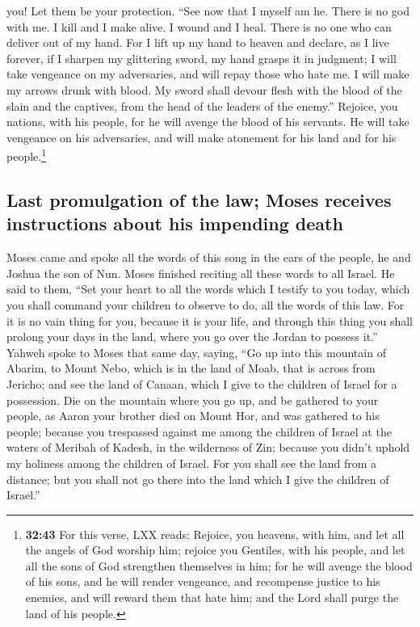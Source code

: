 you! Let them be your protection.  ``See now that I
myself am he. There is no god with me. I kill and I make alive. I wound
and I heal. There is no one who can deliver out of my hand.
 For I lift up my hand to heaven and declare, as I live
forever,  if I sharpen my glittering sword, my hand
grasps it in judgment; I will take vengeance on my adversaries, and will
repay those who hate me.  I will make my arrows drunk
with blood. My sword shall devour flesh with the blood of the slain and
the captives, from the head of the leaders of the enemy.''
 Rejoice, you nations, with his people, for he will
avenge the blood of his servants. He will take vengeance on his
adversaries, and will make atonement for his land and for his
people.\footnote{\textbf{32:43} For this verse, LXX reads: Rejoice, you
  heavens, with him, and let all the angels of God worship him; rejoice
  you Gentiles, with his people, and let all the sons of God strengthen
  themselves in him; for he will avenge the blood of his sons, and he
  will render vengeance, and recompense justice to his enemies, and will
  reward them that hate him; and the Lord shall purge the land of his
  people.}

\hypertarget{last-promulgation-of-the-law-moses-receives-instructions-about-his-impending-death}{%
\subsection{Last promulgation of the law; Moses receives instructions
about his impending
death}\label{last-promulgation-of-the-law-moses-receives-instructions-about-his-impending-death}}

 Moses came and spoke all the words of this song in the
ears of the people, he and Joshua the son of Nun.  Moses
finished reciting all these words to all Israel.  He said
to them, ``Set your heart to all the words which I testify to you today,
which you shall command your children to observe to do, all the words of
this law.  For it is no vain thing for you, because it is
your life, and through this thing you shall prolong your days in the
land, where you go over the Jordan to possess it.'' 
Yahweh spoke to Moses that same day, saying,  ``Go up
into this mountain of Abarim, to Mount Nebo, which is in the land of
Moab, that is across from Jericho; and see the land of Canaan, which I
give to the children of Israel for a possession.  Die on
the mountain where you go up, and be gathered to your people, as Aaron
your brother died on Mount Hor, and was gathered to his people;
 because you trespassed against me among the children of
Israel at the waters of Meribah of Kadesh, in the wilderness of Zin;
because you didn't uphold my holiness among the children of Israel.
 For you shall see the land from a distance; but you
shall not go there into the land which I give the children of Israel.''

